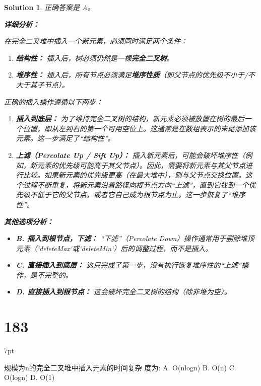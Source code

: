 \documentclass[UTF8]{report}
\newtheorem{solution}{Solution}
\theoremstyle{MyLineTheoremStyle} %
\theoremstyle{MyBlockTheoremStyle} %
\theoremstyle{MySubsubsectionStyle} %
\newenvironment{graybox}{%
        \def\FrameCommand{%
        \hspace{1pt}%
        {\color{gray}\small \vrule width 2pt}%
        {\color{graybox_color}\vrule width 4pt}%
        \colorbox{graybox_color}%
        }%
        \MakeFramed{\advance\hsize-\width\FrameRestore}%
        \noindent\hspace{-4.55pt}%
        \begin{adjustwidth}{}{7pt}%
        \vspace{2pt}\vspace{2pt}%
        }
        {%
        \vspace{2pt}\end{adjustwidth}\endMakeFramed%
        }
\begin{document}
\begin{solution}
正确答案是 A。

\textbf{详细分析：}

在完全二叉堆中插入一个新元素，必须同时满足两个条件：
\begin{enumerate}
    \item \textbf{结构性：} 插入后，树必须仍然是一棵\textbf{完全二叉树}。
    \item \textbf{堆序性：} 插入后，所有节点必须满足\textbf{堆序性质}（即父节点的优先级不小于/不大于其子节点）。
\end{enumerate}

正确的插入操作遵循以下两步：

\begin{enumerate}
    \item \textbf{插入到底层：} 为了维持完全二叉树的结构，新元素必须被放置在树的最后一个位置，即从左到右的第一个可用空位上。这通常是在数组表示的末尾添加该元素。这一步满足了“结构性”。

    \item \textbf{上滤（Percolate Up / Sift Up）：} 插入新元素后，可能会破坏堆序性（例如，新元素的优先级可能高于其父节点）。因此，需要将新元素与其父节点进行比较。如果新元素的优先级更高（在最大堆中），则与父节点交换位置。这个过程不断重复，将新元素沿着路径向根节点方向“上滤”，直到它找到一个优先级不低于它的父节点，或者它自己成为根节点为止。这一步恢复了“堆序性”。
\end{enumerate}

\textbf{其他选项分析：}
\begin{itemize}
    \item \textbf{B. 插入到根节点，下滤：} “下滤”（Percolate Down）操作通常用于删除堆顶元素（`deleteMax`或`deleteMin`）后的调整过程，而不是插入。
    \item \textbf{C. 直接插入到底层：} 这只完成了第一步，没有执行恢复堆序性的“上滤”操作，是不完整的。
    \item \textbf{D. 直接插入到根节点：} 这会破坏完全二叉树的结构（除非堆为空）。
\end{itemize}
\end{solution}


\section*{183}
\begin{graybox}
规模为n的完全二叉堆中插入元素的时间复杂
度为:
A. O(nlogn)
B. O(n)
C. O(logn)
D. O(1)
\end{graybox}
\end{document}
